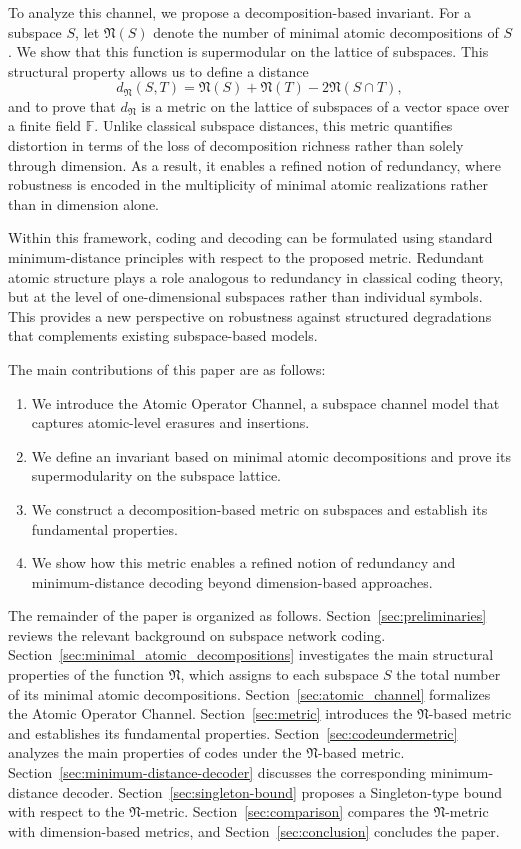 \documentclass{svproc}
\begin{document}
To analyze this channel, we propose a decomposition-based invariant. For a subspace $S$, let $\mathfrak{N}(S)$ denote the number of minimal atomic decompositions of $S$. We show that this function is supermodular on the lattice of subspaces. This structural property allows us to define a distance
\[
d_{\mathfrak{N}}(S,T) = \mathfrak{N}(S) + \mathfrak{N}(T) - 2\mathfrak{N}(S \cap T),
\]
and to prove that $d_\mathfrak{N}$ is a metric on the lattice of subspaces of a vector space over a finite field $\mathbb{F}$. Unlike classical subspace distances, this metric quantifies distortion in terms of the loss of decomposition richness rather than solely through dimension. As a result, it enables a refined notion of redundancy, where robustness is encoded in the multiplicity of minimal atomic realizations rather than in dimension alone.

Within this framework, coding and decoding can be formulated using standard minimum-distance principles with respect to the proposed metric. Redundant atomic structure plays a role analogous to redundancy in classical coding theory, but at the level of one-dimensional subspaces rather than individual symbols. This provides a new perspective on robustness against structured degradations that complements existing subspace-based models.


The main contributions of this paper are as follows:
\begin{enumerate}
    \item We introduce the Atomic Operator Channel, a subspace channel model that captures atomic-level erasures and insertions.
    \item We define an invariant based on minimal atomic decompositions and prove its supermodularity on the subspace lattice.
    \item We construct a decomposition-based metric on subspaces and establish its fundamental properties.
    \item We show how this metric enables a refined notion of redundancy and minimum-distance decoding beyond dimension-based approaches.
\end{enumerate}

The remainder of the paper is organized as follows. 
Section~\ref{sec:preliminaries} reviews the relevant background on subspace network coding. 
Section~\ref{sec:minimal_atomic_decompositions} investigates the main structural properties of the function $\mathfrak{N}$, which assigns to each subspace $S$ the total number of its minimal atomic decompositions. 
Section~\ref{sec:atomic_channel} formalizes the Atomic Operator Channel. 
Section~\ref{sec:metric} introduces the $\mathfrak{N}$-based metric and establishes its fundamental properties. 
Section~\ref{sec:codeundermetric} analyzes the main properties of codes under the $\mathfrak{N}$-based metric. 
Section~\ref{sec:minimum-distance-decoder} discusses the corresponding minimum-distance decoder. 
Section~\ref{sec:singleton-bound} proposes a Singleton-type bound with respect to the $\mathfrak{N}$-metric. 
Section~\ref{sec:comparison} compares the $\mathfrak{N}$-metric with dimension-based metrics, and Section~\ref{sec:conclusion} concludes the paper.
\end{document}
